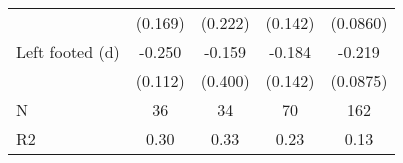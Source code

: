{\begin{tabular}{l*{4}{c}}
                    &     (0.169)         &     (0.222)         &     (0.142)         &    (0.0860)         \\
[1em]
Left footed (d)     &      -0.250\sym{**} &      -0.159         &      -0.184         &      -0.219\sym{**} \\
                    &     (0.112)         &     (0.400)         &     (0.142)         &    (0.0875)         \\
\hline
N                   &          36         &          34         &          70         &         162         \\
R2                  &        0.30         &        0.33         &        0.23         &        0.13         \\
\hline\hline
\end{tabular}
}
